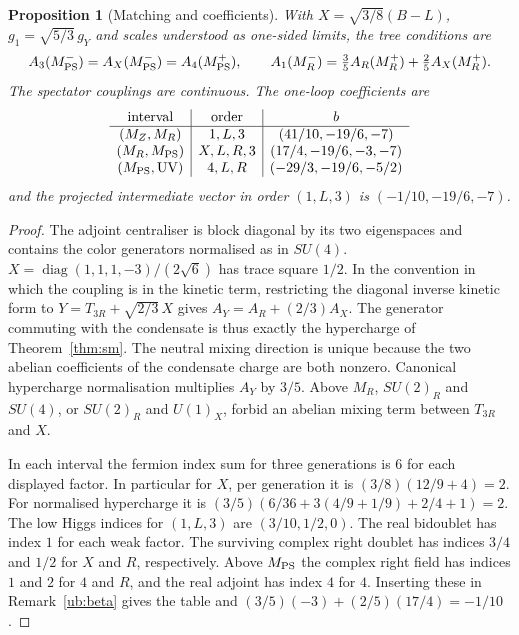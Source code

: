 \documentclass[aps,pra,onecolumn,superscriptaddress,nofootinbib,10pt]{revtex4-2}
\newtheorem{proposition}[theorem]{Proposition}
\theoremstyle{definition}
\theoremstyle{remark}
\begin{document}
\begin{proposition}[Matching and coefficients]\label{ub:matching}
With $X=\sqrt{3/8}(B-L)$, $g_1=\sqrt{5/3}\,g_Y$ and scales understood
as one-sided limits, the tree conditions are
\[
 A_3(M_{\rm PS}^-)=A_X(M_{\rm PS}^-)=A_4(M_{\rm PS}^+),\qquad
 A_1(M_R^-)=\tfrac35 A_R(M_R^+)+\tfrac25 A_X(M_R^+).
\]
The spectator couplings are continuous. The one-loop coefficients are
\[
 \begin{array}{c|c|c}
 \text{interval}&\text{order}& b\\ \hline
 (M_Z,M_R)&1,L,3&(41/10,-19/6,-7)\\
 (M_R,M_{\rm PS})&X,L,R,3&(17/4,-19/6,-3,-7)\\
 (M_{\rm PS},\text{UV})&4,L,R&(-29/3,-19/6,-5/2)
 \end{array}
\]
and the projected intermediate vector in order $(1,L,3)$ is
$(-1/10,-19/6,-7)$.
\end{proposition}
\begin{proof}
The adjoint centraliser is block diagonal by its two eigenspaces and
contains the color generators normalised as in $SU(4)$.
$X=\operatorname{diag}(1,1,1,-3)/(2\sqrt6)$ has trace square $1/2$.
In the convention in which the coupling is in the kinetic term,
restricting the diagonal inverse kinetic form to
$Y=T_{3R}+\sqrt{2/3}\,X$ gives
$A_Y=A_R+(2/3)A_X$. The generator commuting with the condensate is
thus exactly the hypercharge of Theorem~\ref{thm:sm}. The neutral
mixing direction is unique because the two abelian coefficients of
the condensate charge are both nonzero. Canonical hypercharge
normalisation multiplies $A_Y$ by $3/5$. Above $M_R$,
$SU(2)_R$ and $SU(4)$, or $SU(2)_R$ and $U(1)_X$, forbid an abelian
mixing term between $T_{3R}$ and $X$.

In each interval the fermion index sum for three generations is $6$
for each displayed factor. In particular for $X$, per generation it is
$(3/8)(12/9+4)=2$. For normalised hypercharge it is
$(3/5)(6/36+3(4/9+1/9)+2/4+1)=2$.
The low Higgs indices for $(1,L,3)$ are $(3/10,1/2,0)$.
The real bidoublet has index $1$ for each weak factor. The surviving
complex right doublet has indices $3/4$ and $1/2$ for $X$ and $R$,
respectively. Above $M_{\rm PS}$ the complex right field has
indices $1$ and $2$ for $4$ and $R$, and the real adjoint has index $4$
for $4$. Inserting these in Remark~\ref{ub:beta} gives the table and
$(3/5)(-3)+(2/5)(17/4)=-1/10$.
\end{proof}
\end{document}
